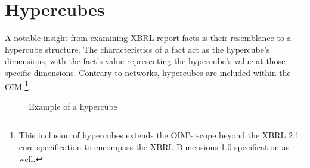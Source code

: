 \section{Hypercubes}
\label{sec:hypercubes}

A notable insight from examining XBRL report facts is their resemblance to a hypercube structure.
The characteristics of a fact act as the hypercube's dimensions, with the fact's value representing the hypercube's value at those specific dimensions.
Contrary to networks, hypercubes are included within the OIM
\footnote{This inclusion of hypercubes extends the OIM's scope beyond the XBRL 2.1 core specification to encompass the XBRL Dimensions 1.0 specification as well.}.

\begin{figure}[H]
    \caption{Example of a hypercube}
    \label{fig:example_hypercube}
\end{figure}

